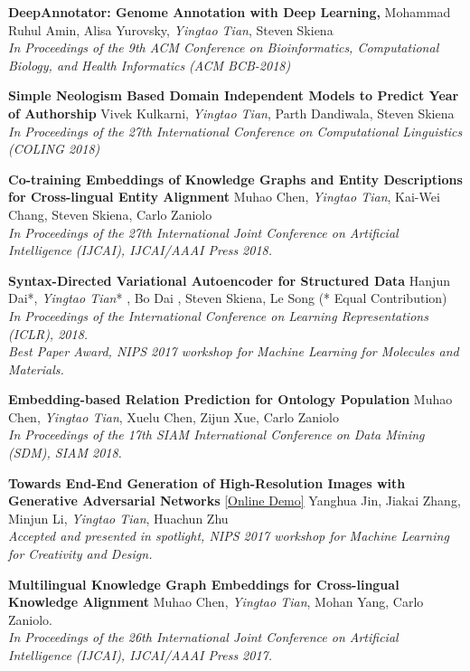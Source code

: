 \documentclass[line,margin]{cv}
\begin{document}
\begin{resume}
  {\bf DeepAnnotator: Genome Annotation with Deep Learning,}
  Mohammad Ruhul Amin, Alisa Yurovsky, \emph{Yingtao Tian}, Steven Skiena \\
  \emph{In Proceedings of the 9th ACM Conference on Bioinformatics, Computational Biology, and Health Informatics (ACM BCB-2018)}
  
  {\bf Simple Neologism Based Domain Independent Models to Predict Year of Authorship}
   Vivek Kulkarni, \emph{Yingtao Tian}, Parth Dandiwala, Steven Skiena \\
  \emph{In Proceedings of the 27th International Conference on Computational Linguistics (COLING 2018)}

  {\bf Co-training Embeddings of Knowledge Graphs and Entity Descriptions for Cross-lingual Entity Alignment}
  Muhao Chen, \emph{Yingtao Tian}, Kai-Wei Chang, Steven Skiena, Carlo Zaniolo\\
  \emph{In Proceedings of the 27th International Joint Conference on Artificial Intelligence (IJCAI), IJCAI/AAAI Press 2018.}
  
  {\bf Syntax-Directed Variational Autoencoder for Structured Data}
  Hanjun Dai*, \emph{Yingtao Tian}* , Bo Dai , Steven Skiena, Le Song (* Equal Contribution)\\
  \emph{In Proceedings of the International Conference on Learning Representations (ICLR), 2018. \\
  Best Paper Award, NIPS 2017 workshop for Machine Learning for Molecules and Materials.}
  
  {\bf Embedding-based Relation Prediction for Ontology Population}
  Muhao Chen, \emph{Yingtao Tian}, Xuelu Chen, Zijun Xue, Carlo Zaniolo\\
  \emph{In Proceedings of the 17th SIAM International Conference on Data Mining (SDM), SIAM 2018.}

  {\bf Towards End-End Generation of High-Resolution Images with Generative Adversarial Networks}
  \href{http://make.girls.moe/#/}{[Online Demo]}
  Yanghua Jin, Jiakai Zhang, Minjun Li, \emph{Yingtao Tian}, Huachun Zhu\\
  \emph{Accepted and presented in spotlight, NIPS 2017 workshop for Machine Learning for Creativity and Design.}

  {\bf Multilingual Knowledge Graph Embeddings for Cross-lingual Knowledge Alignment}
  Muhao Chen, \emph{Yingtao Tian}, Mohan Yang, Carlo Zaniolo.\\
  \emph{In Proceedings of the 26th International Joint Conference on Artificial Intelligence (IJCAI), IJCAI/AAAI Press 2017.}


\end{resume}
\end{document}
